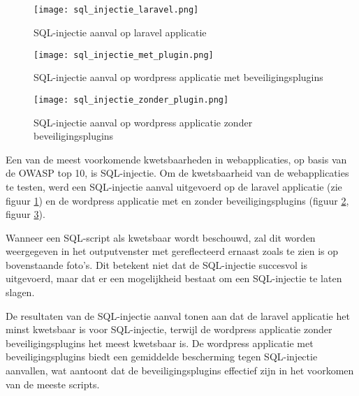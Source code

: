 \subsection{}
\begin{figure}
    \centering
    \texttt{[image: sql\_injectie\_laravel.png]}
    \caption[SQL-injectie aanval op laravel applicatie]{SQL-injectie aanval op laravel applicatie}
    \label{fig:injectie_laravel}
\end{figure}
\begin{figure}
    \centering
    \texttt{[image: sql\_injectie\_met\_plugin.png]}
    \caption[SQL-injectie aanval op wordpress applicatie met beveiligingsplugins]{SQL-injectie aanval op wordpress applicatie met beveiligingsplugins}
    \label{fig:injectie_zonder}
\end{figure}
\begin{figure}
    \centering
    \texttt{[image: sql\_injectie\_zonder\_plugin.png]}
    \caption[SQL-injectie aanval op wordpress applicatie zonder beveiligingsplugins]{SQL-injectie aanval op wordpress applicatie zonder beveiligingsplugins}
    \label{fig:injectie_met}
\end{figure}


Een van de meest voorkomende kwetsbaarheden in webapplicaties, op basis van de OWASP top 10, is SQL-injectie. Om de 
kwetsbaarheid van de webapplicaties 
te testen, werd een SQL-injectie aanval uitgevoerd op de laravel applicatie (zie figuur \ref{fig:injectie_laravel}) en de 
wordpress applicatie met en zonder beveiligingsplugins (figuur \ref{fig:injectie_zonder}, figuur \ref{fig:injectie_met}). 

Wanneer een SQL-script als kwetsbaar wordt beschouwd, zal dit worden weergegeven in het outputvenster met gereflecteerd ernaast 
zoals te zien is op bovenstaande foto's. 
Dit betekent niet dat de SQL-injectie succesvol is uitgevoerd, maar dat er een mogelijkheid bestaat om een SQL-injectie te laten 
slagen. 

De resultaten van de SQL-injectie aanval tonen aan dat de laravel applicatie het minst kwetsbaar is voor SQL-injectie, terwijl 
de wordpress applicatie zonder beveiligingsplugins het meest kwetsbaar is. De wordpress applicatie met beveiligingsplugins 
biedt een gemiddelde bescherming tegen SQL-injectie aanvallen, wat aantoont dat de beveiligingsplugins effectief zijn in het 
voorkomen van de meeste scripts. 

